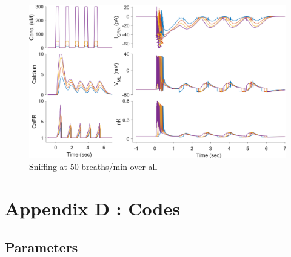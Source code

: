\documentclass[
]{article}
\begin{document}
\begin{figure}

{\centering \includegraphics[width=0.9\linewidth]{figs/sniff/fig_spk_sniffing_50bpm} 

}

\caption{Sniffing at 50 breaths/min over-all}\label{fig:f50bpm}
\end{figure}

\clearpage

\hypertarget{appendix-d-codes}{%
\section*{Appendix D : Codes}\label{appendix-d-codes}}

\hypertarget{parameters}{%
\subsection*{Parameters}\label{parameters}}
\end{document}
